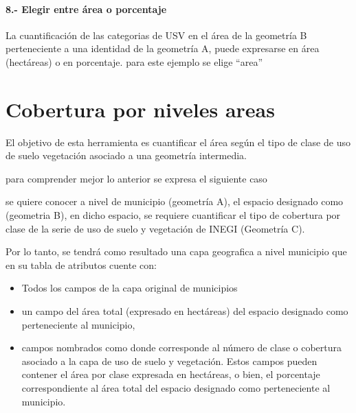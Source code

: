 \documentclass[letterpaper,10pt,spanish]{sphinxmanual}
\begin{document}
\noindent{}


\paragraph{8.- Elegir entre área o porcentaje}
\label{\detokenize{tabulacion_3geo:elegir-entre-area-o-porcentaje}}
La cuantificación de las categorias de USV en el área de la geometría B perteneciente
a una identidad de la geometría A, puede expresarse en área (hectáreas) o en porcentaje.
para este ejemplo se elige “area”

\noindent{}


\section{Cobertura por niveles areas}
\label{\detokenize{nivel_geometrias:cobertura-por-niveles-areas}}\label{\detokenize{nivel_geometrias::doc}}
El objetivo de esta herramienta es cuantificar el área según el tipo de clase
de uso de suelo vegetación asociado a una geometría intermedia.

para comprender mejor lo anterior se expresa el siguiente caso

se quiere conocer a nivel de municipio (geometría A), el espacio designado como 
(geometria B), en dicho espacio, se requiere cuantificar el tipo de cobertura por clase
de la serie de uso de suelo y vegetación de INEGI (Geometría C).

Por lo tanto, se tendrá como resultado una capa geografica a nivel municipio que en su tabla de atributos
cuente con:
\begin{itemize}
\item {} 
Todos los campos de la capa original de municipios

\item {} 
un campo del área total (expresado en hectáreas) del espacio designado como  perteneciente al municipio,

\item {} 
campos nombrados como  donde \sphinxstylestrong{\#} corresponde al número de clase o cobertura asociado a la capa de uso de suelo y vegetación. Estos campos pueden contener el área por clase expresada en hectáreas, o bien, el porcentaje correspondiente al área total del espacio designado como  perteneciente al municipio.

\end{itemize}
\end{document}
